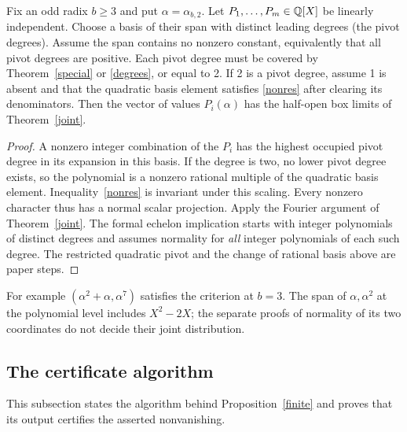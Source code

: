 \documentclass[11pt]{article}
\begin{document}
\begin{corollary}\label{echelon}
Fix an odd radix \(b\ge3\) and put \(\alpha=\alpha_{b,2}\).
Let \(P_1,\ldots,P_m\in\mathbb Q[X]\) be linearly independent. Choose a basis
of their span with distinct leading degrees (the pivot degrees). Assume
the span contains no nonzero constant, equivalently that all pivot degrees
are positive. Each pivot degree must be covered by Theorem~\ref{special}
or \ref{degrees}, or equal to 2.
If 2 is a pivot degree, assume 1 is absent and that the
quadratic basis element satisfies \eqref{nonres} after clearing its
denominators. Then the vector of values \(P_i(\alpha)\) has the
half-open box limits of Theorem~\ref{joint}.
\end{corollary}
\begin{proof}
A nonzero integer combination of the \(P_i\) has the highest occupied pivot
degree in its expansion in this basis. If the degree is two, no lower
pivot degree exists, so the polynomial is a nonzero rational multiple of the
quadratic basis element. Inequality~\eqref{nonres} is invariant under this scaling.
Every nonzero character thus has a normal scalar projection. Apply the
Fourier argument of Theorem~\ref{joint}. The 
{formal echelon implication} starts with integer polynomials of distinct
degrees and assumes normality for \emph{all} integer polynomials of each
such degree. The restricted quadratic pivot and the change of rational
basis above are paper steps.
\end{proof}
For example \((\alpha^2+\alpha,\alpha^7)\) satisfies the criterion at
\(b=3\). The span of \(\alpha,\alpha^2\) at the polynomial level includes
\(X^2-2X\); the separate proofs of normality of its two coordinates do
not decide their joint distribution.

\subsection{The certificate algorithm}\label{algsec}
This subsection states the algorithm behind Proposition~\ref{finite} and
proves that its output certifies the asserted nonvanishing.
\end{document}

